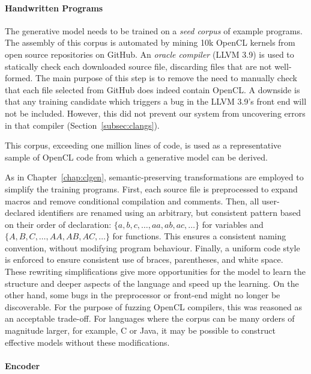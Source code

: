 \paragraph*{Handwritten Programs}

The generative model needs to be trained on a \emph{seed corpus} of example programs. The assembly of this corpus is automated by mining 10k OpenCL kernels from open source repositories on GitHub. An \emph{oracle compiler} (LLVM 3.9) is used to statically check each downloaded source file, discarding files that are not well-formed. The main purpose of this step is to remove the need to manually check that each file selected from GitHub does indeed contain OpenCL. A downside is that any training candidate which triggers a bug in the LLVM 3.9's front end will not be included. However, this did not prevent our system from uncovering errors in that compiler (Section~\ref{subsec:clangs}).

This corpus, exceeding one million lines of code, is used as a representative sample of OpenCL code from which a generative model can be derived.

As in Chapter~\ref{chap:clgen}, semantic-preserving transformations are employed to simplify the training programs. First, each source file is preprocessed to expand macros and remove conditional compilation and comments. Then, all user-declared identifiers are renamed using an arbitrary, but consistent pattern based on their order of declaration: $\{a,\allowbreak b,\allowbreak c,\allowbreak \ldots,\allowbreak aa,\allowbreak ab,\allowbreak ac,\allowbreak \ldots\}$ for variables and $\{A,\allowbreak B,\allowbreak C,\allowbreak \ldots,\allowbreak AA,\allowbreak AB,\allowbreak AC,\allowbreak \ldots\}$ for functions. This ensures a consistent naming convention, without modifying program behaviour. Finally, a uniform code style is enforced to ensure consistent use of braces, parentheses, and white space. These rewriting simplifications give more opportunities for the model to learn the structure and deeper aspects of the language and speed up the learning. On the other hand, some bugs in the preprocessor or front-end might no longer be discoverable. For the purpose of fuzzing OpenCL compilers, this was reasoned as an acceptable trade-off. For languages where the corpus can be many orders of magnitude larger, for example, C or Java, it may be possible to construct effective models without these modifications.


\paragraph*{Encoder}

